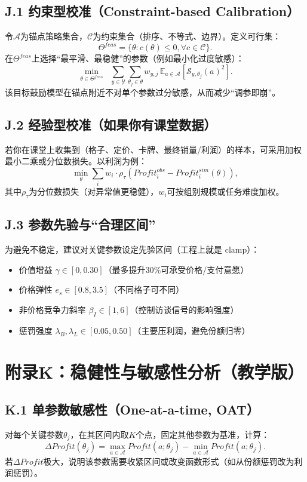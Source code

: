 \documentclass[UTF8,12pt]{ctexart}
\begin{document}
\subsection{J.1 约束型校准（Constraint-based Calibration）}
令$\mathcal{A}$为锚点策略集合，$\mathcal{C}$为约束集合（排序、不等式、边界）。定义可行集：
\[
\Theta^{feas}=\{\theta: c(\theta)\le 0, \forall c\in\mathcal{C}\}.
\]
在$\Theta^{feas}$上选择“最平滑、最稳健”的参数（例如最小化过度敏感）：
\[
\min_{\theta\in\Theta^{feas}} \;\; \sum_{y\in\mathcal{Y}}\sum_{\theta_j\in\theta} w_{y,j}\, \mathbb{E}_{a\in\mathcal{A}}\left[\mathcal{S}_{y,\theta_j}(a)^2\right].
\]
该目标鼓励模型在锚点附近不对单个参数过分敏感，从而减少“调参即崩”。

\subsection{J.2 经验型校准（如果你有课堂数据）}
若你在课堂上收集到（格子、定价、卡牌、最终销量/利润）的样本，可采用加权最小二乘或分位数损失。以利润为例：
\[
\min_{\theta}\sum_{i} w_i \cdot \rho_\tau\!\left( Profit_i^{obs}-Profit_i^{sim}(\theta)\right),
\]
其中$\rho_\tau$为分位数损失（对异常值更稳健），$w_i$可按组别规模或任务难度加权。

\subsection{J.3 参数先验与“合理区间”}
为避免不稳定，建议对关键参数设定先验区间（工程上就是 clamp）：
\begin{itemize}
  \item 价值增益 $\gamma\in[0,0.30]$（最多提升$30\%$可承受价格/支付意愿）
  \item 价格弹性 $e_s\in[0.8,3.5]$（不同格子可不同）
  \item 非价格竞争力斜率 $\beta_I\in[1,6]$（控制访谈信号的影响强度）
  \item 惩罚强度 $\lambda_B,\lambda_L\in[0.05,0.50]$（主要压利润，避免份额归零）
\end{itemize}

\section{附录K：稳健性与敏感性分析（教学版）}
\subsection{K.1 单参数敏感性（One-at-a-time, OAT）}
对每个关键参数$\theta_j$，在其区间内取$K$个点，固定其他参数为基准，计算：
\[
\Delta Profit(\theta_j)=\max_{a\in\mathcal{A}} Profit(a;\theta_j)-\min_{a\in\mathcal{A}} Profit(a;\theta_j).
\]
若$\Delta Profit$极大，说明该参数需要收紧区间或改变函数形式（如从份额惩罚改为利润惩罚）。
\end{document}
